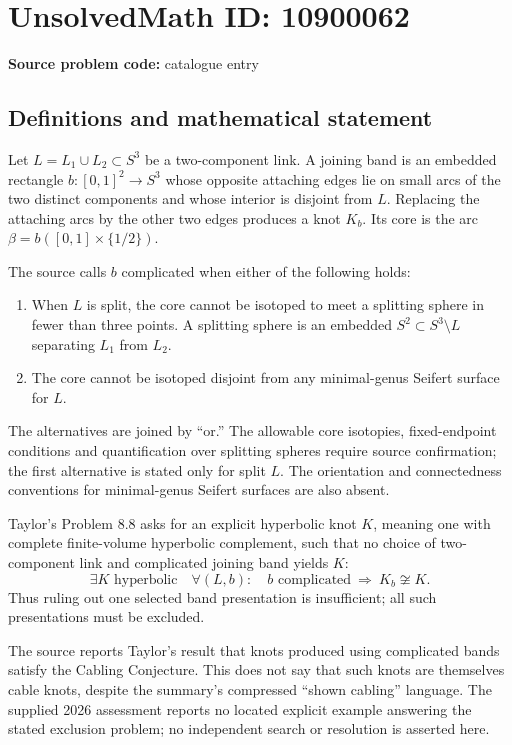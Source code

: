 \documentclass[11pt]{article}
\begin{document}
\section*{UnsolvedMath ID: 10900062}
\textbf{Source problem code:} catalogue entry
\subsection{Definitions and mathematical statement}
Let \(L=L_1\cup L_2\subset S^3\) be a two-component link. A joining band is an embedded rectangle \(b:[0,1]^2\to S^3\) whose opposite attaching edges lie on small arcs of the two distinct components and whose interior is disjoint from \(L\). Replacing the attaching arcs by the other two edges produces a knot \(K_b\). Its core is the arc \(\beta=b([0,1]\times\{1/2\})\).

The source calls \(b\) complicated when either of the following holds:
\begin{enumerate}
\item When \(L\) is split, the core cannot be isotoped to meet a splitting sphere in fewer than three points. A splitting sphere is an embedded \(S^2\subset S^3\setminus L\) separating \(L_1\) from \(L_2\).
\item The core cannot be isotoped disjoint from any minimal-genus Seifert surface for \(L\).
\end{enumerate}
The alternatives are joined by ``or.'' The allowable core isotopies, fixed-endpoint conditions and quantification over splitting spheres require source confirmation; the first alternative is stated only for split \(L\). The orientation and connectedness conventions for minimal-genus Seifert surfaces are also absent.

Taylor's Problem 8.8 asks for an explicit hyperbolic knot \(K\), meaning one with complete finite-volume hyperbolic complement, such that no choice of two-component link and complicated joining band yields \(K\):
\[
 \exists K\text{ hyperbolic}\quad
 \forall(L,b):\quad b\text{ complicated}\ \Longrightarrow\ K_b\not\cong K.
\]
Thus ruling out one selected band presentation is insufficient; all such presentations must be excluded.

The source reports Taylor's result that knots produced using complicated bands satisfy the Cabling Conjecture. This does not say that such knots are themselves cable knots, despite the summary's compressed ``shown cabling'' language. The supplied 2026 assessment reports no located explicit example answering the stated exclusion problem; no independent search or resolution is asserted here.
\end{document}

